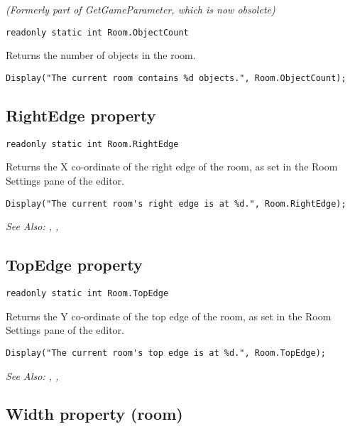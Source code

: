 \it{(Formerly part of GetGameParameter, which is now obsolete)}

\begin{verbatim}
readonly static int Room.ObjectCount
\end{verbatim}
Returns the number of objects in the room.

\begin{verbatim}
Display("The current room contains %d objects.", Room.ObjectCount);
\end{verbatim}


\subsection{RightEdge property}\label{Room.RightEdge}%

\begin{verbatim}
readonly static int Room.RightEdge
\end{verbatim}
Returns the X co-ordinate of the right edge of the room, as set in the Room Settings
pane of the editor.

\begin{verbatim}
Display("The current room's right edge is at %d.", Room.RightEdge);
\end{verbatim}

\it{See Also:} , ,


\subsection{TopEdge property}\label{Room.TopEdge}%

\begin{verbatim}
readonly static int Room.TopEdge
\end{verbatim}
Returns the Y co-ordinate of the top edge of the room, as set in the Room Settings
pane of the editor.

\begin{verbatim}
Display("The current room's top edge is at %d.", Room.TopEdge);
\end{verbatim}

\it{See Also:} , ,


\subsection{Width property (room)}\label{Room.Width}%

